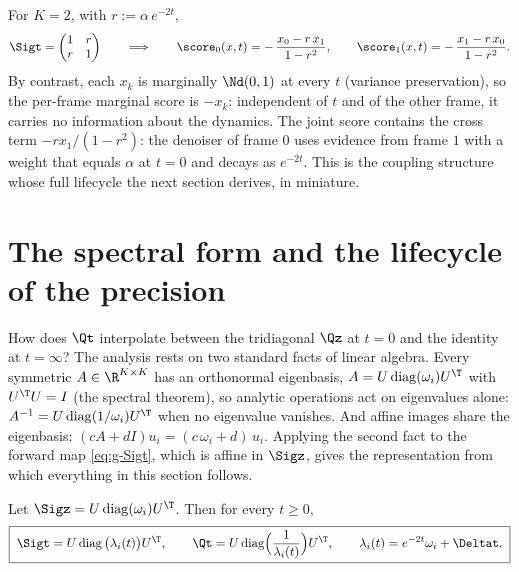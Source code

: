 For $K = 2$, with $r := \alpha\, e^{-2t}$,
\begin{equation}
  \Sigt = \begin{pmatrix} 1 & r \\ r & 1 \end{pmatrix}
  \qquad\Longrightarrow\qquad
  \score_0(x, t) = -\,\frac{x_0 - r\, x_1}{1 - r^2},
  \qquad
  \score_1(x, t) = -\,\frac{x_1 - r\, x_0}{1 - r^2}.
  \label{eq:g-K2-score}
\end{equation}
By contrast, each $x_k$ is marginally $\Nd(0,1)$ at every $t$ (variance
preservation), so the per-frame marginal score is $-x_k$: independent of
$t$ and of the other frame, it carries no information about the dynamics.
The joint score contains the cross term $-r x_1/(1-r^2)$: the denoiser of
frame $0$ uses evidence from frame $1$ with a weight that equals $\alpha$
at $t = 0$ and decays as $e^{-2t}$. This is the coupling structure whose
full lifecycle the next section derives, in miniature.

\section{The spectral form and the lifecycle of the precision}
\label{sec:g-lifecycle}

How does $\Qt$ interpolate between the tridiagonal $\Qz$ at $t = 0$ and
the identity at $t = \infty$? The analysis rests on two standard facts of
linear algebra. Every symmetric $A \in \R^{K \times K}$ has an orthonormal
eigenbasis, $A = U \operatorname{diag}(\omega_i) U^\T$ with
$U^\T U = I$ (the spectral theorem), so analytic operations act on
eigenvalues alone: $A^{-1} = U \operatorname{diag}(1/\omega_i) U^\T$ when
no eigenvalue vanishes. And affine images share the eigenbasis:
$(cA + dI) u_i = (c\,\omega_i + d)\, u_i$. Applying the second fact to the
forward map \eqref{eq:g-Sigt}, which is affine in $\Sigz$, gives the
representation from which everything in this section follows.

\begin{theorem}\label{thm:g-three-forms}
Let $\Sigz = U \operatorname{diag}(\omega_i) U^\T$. Then for every
$t \geq 0$,
\begin{equation}
  \boxed{\;
  \Sigt = U \operatorname{diag}\big( \lambda_i(t) \big) U^\T,
  \qquad
  \Qt = U \operatorname{diag}\!\Big( \frac{1}{\lambda_i(t)} \Big) U^\T,
  \qquad
  \lambda_i(t) = e^{-2t} \omega_i + \Deltat .
  \;}
  \label{eq:g-Qt-spec}
\end{equation}
\end{theorem}

